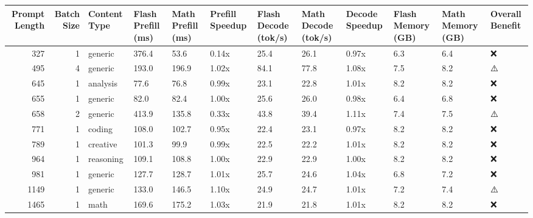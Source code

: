 \begin{tabular}{rrllllllllll}
\toprule
Prompt Length & Batch Size & Content Type & Flash Prefill (ms) & Math Prefill (ms) & Prefill Speedup & Flash Decode (tok/s) & Math Decode (tok/s) & Decode Speedup & Flash Memory (GB) & Math Memory (GB) & Overall Benefit \\
\midrule
327 & 1 & generic & 376.4 & 53.6 & 0.14x & 25.4 & 26.1 & 0.97x & 6.3 & 6.4 & ❌ \\
495 & 4 & generic & 193.0 & 196.9 & 1.02x & 84.1 & 77.8 & 1.08x & 7.5 & 8.2 & ⚠️ \\
645 & 1 & analysis & 77.6 & 76.8 & 0.99x & 23.1 & 22.8 & 1.01x & 8.2 & 8.2 & ❌ \\
655 & 1 & generic & 82.0 & 82.4 & 1.00x & 25.6 & 26.0 & 0.98x & 6.4 & 6.8 & ❌ \\
658 & 2 & generic & 413.9 & 135.8 & 0.33x & 43.8 & 39.4 & 1.11x & 7.4 & 7.5 & ⚠️ \\
771 & 1 & coding & 108.0 & 102.7 & 0.95x & 22.4 & 23.1 & 0.97x & 8.2 & 8.2 & ❌ \\
789 & 1 & creative & 101.3 & 99.9 & 0.99x & 22.5 & 22.2 & 1.01x & 8.2 & 8.2 & ❌ \\
964 & 1 & reasoning & 109.1 & 108.8 & 1.00x & 22.9 & 22.9 & 1.00x & 8.2 & 8.2 & ❌ \\
981 & 1 & generic & 127.7 & 128.7 & 1.01x & 25.7 & 24.6 & 1.04x & 6.8 & 7.2 & ❌ \\
1149 & 1 & generic & 133.0 & 146.5 & 1.10x & 24.9 & 24.7 & 1.01x & 7.2 & 7.4 & ⚠️ \\
1465 & 1 & math & 169.6 & 175.2 & 1.03x & 21.9 & 21.8 & 1.01x & 8.2 & 8.2 & ❌ \\
\bottomrule
\end{tabular}
